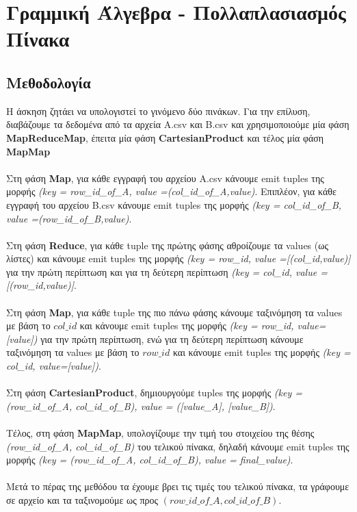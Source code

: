 \documentclass{ntua}
\begin{document}
\newpage

\section{Γραμμική Άλγεβρα - Πολλαπλασιασμός Πίνακα}

\subsection{Μεθοδολογία}
H άσκηση ζητάει να υπολογιστεί το γινόμενο δύο πινάκων. Για την επίλυση, διαβάζουμε τα δεδομένα από τα αρχεία Α.csv και B.csv και χρησιμοποιούμε μία φάση \textbf{MapReduceMap}, έπειτα μία φάση \textbf{CartesianProduct} και τέλος μία φάση \textbf{MapMap}  \\ \\
Στη φάση \textbf{Map}, για κάθε εγγραφή του αρχείου A.csv κάνουμε emit tuples της μορφής \emph{(key = row\_id\_of\_A, value =(col\_id\_of\_A,value)}. Επιπλέον, για κάθε εγγραφή του αρχείου Β.csv κάνουμε emit tuples της μορφής \emph{(key = col\_id\_of\_B, value =(row\_id\_of\_B,value)}.\\ \\
Στη φάση \textbf{Reduce}, για κάθε tuple της πρώτης φάσης αθροίζουμε τα values (ως λίστες) και κάνουμε emit tuples της μορφής \emph{(key = row\_id, value =[(col\_id,value)]} για την πρώτη περίπτωση και για τη δεύτερη περίπτωση \emph{(key = col\_id, value =[(row\_id,value)]}. \\ \\
Στη φάση \textbf{Map}, για κάθε tuple της πιο πάνω φάσης κάνουμε ταξινόμηση τα values με βάση το $ col\_id$ και κάνουμε emit tuples της μορφής \emph{(key = row\_id, value=[value])} για την πρώτη περίπτωση, ενώ για τη δεύτερη περίπτωση κάνουμε ταξινόμηση τα values με βάση το $ row\_id$ και κάνουμε emit tuples της μορφής \emph{(key = col\_id, value=[value])}.\\ \\
Στη φάση \textbf{CartesianProduct}, δημιουργούμε tuples της μορφής \emph{(key = (row\_id\_of\_A, col\_id\_of\_B), value = ([value\_A], [value\_B])}.\\ \\
Τέλος, στη φάση \textbf{MapMap}, υπολογίζουμε την τιμή του στοιχείου της θέσης \emph{(row\_id\_of\_A, col\_id\_of\_B)} του τελικού πίνακα, δηλαδή κάνουμε emit tuples της μορφής \emph{(key = (row\_id\_of\_A, col\_id\_of\_B), value = final\_value)}. \\ \\
Μετά το πέρας της μεθόδου τα έχουμε βρει τις τιμές του τελικού πίνακα, τα γράφουμε σε αρχείο και τα ταξινομούμε ως προς $(row\_id\_of\_A,col\_id\_of\_B)$.
  
\end{document}
